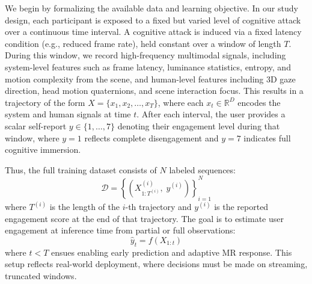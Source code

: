 \documentclass[review]{vgtc}                 %
\begin{document}
We begin by formalizing the available data and learning objective. In our study design, each participant is exposed to a fixed but varied level of cognitive attack over a continuous time interval. A cognitive attack is induced via a fixed latency condition (e.g., reduced frame rate), held constant over a window of length $T$. During this window, we record high-frequency multimodal signals, including system-level features such as frame latency, luminance statistics, entropy, and motion complexity from the scene, and human-level features including 3D gaze direction, head motion quaternions, and scene interaction focus.
This results in a trajectory of the form $X = \{x_1, x_2, \dots, x_T\}$, where each $x_t \in \mathbb{R}^D$ encodes the system and human signals at time $t$. After each interval, the user provides a scalar self-report $y \in \{1, \dots, 7\}$ denoting their engagement level during that window, where $y=1$ reflects complete disengagement and $y=7$ indicates full cognitive immersion.

Thus, the full training dataset consists of $N$ labeled sequences:
\[
\mathcal{D} = \left\{ (X^{(i)}_{1:T^{(i)}},\; y^{(i)}) \right\}_{i=1}^N
\]
where $T^{(i)}$ is the length of the $i$-th trajectory and $y^{(i)}$ is the reported engagement score at the end of that trajectory. The goal is to estimate user engagement at inference time from partial or full observations:
\[
\hat{y}_t = f(X_{1:t})
\]
where $t < T$ ensues enabling early prediction and adaptive MR response. This setup reflects real-world deployment, where decisions must be made on streaming, truncated windows.
\end{document}
